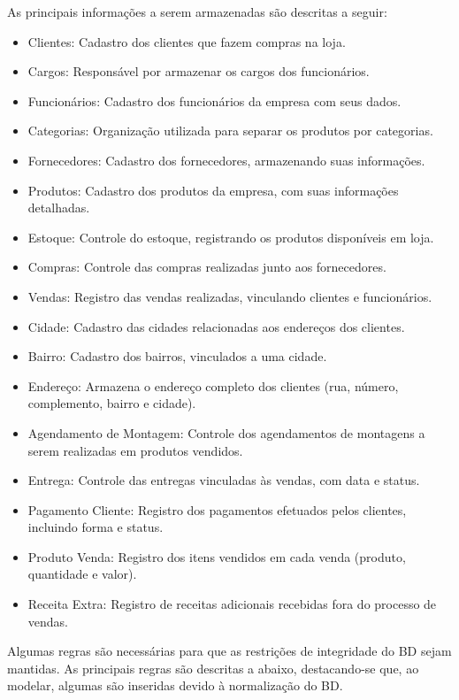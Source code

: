 \documentclass[
12pt,
a4paper,
semrecuonosumario,
sumario = abnt-6027-2012]{report}
\begin{document}
	As principais informações a serem armazenadas são descritas a seguir:
	\begin{itemize}
	\item Clientes: Cadastro dos clientes que fazem compras na loja.
	
	\item Cargos: Responsável por armazenar os cargos dos funcionários.
	
	\item Funcionários: Cadastro dos funcionários da empresa com seus dados.
	
	\item Categorias: Organização utilizada para separar os produtos por categorias.
	
	\item Fornecedores: Cadastro dos fornecedores, armazenando suas informações.
	
	\item Produtos: Cadastro dos produtos da empresa, com suas informações detalhadas.
	
	\item Estoque: Controle do estoque, registrando os produtos disponíveis em loja.
	
	\item Compras: Controle das compras realizadas junto aos fornecedores.
	
	\item Vendas: Registro das vendas realizadas, vinculando clientes e funcionários.
	
	\item Cidade: Cadastro das cidades relacionadas aos endereços dos clientes.
	
	\item Bairro: Cadastro dos bairros, vinculados a uma cidade.
	
	\item Endereço: Armazena o endereço completo dos clientes (rua, número, complemento, bairro e cidade).
	
	\item Agendamento de Montagem: Controle dos agendamentos de montagens a serem realizadas em produtos vendidos.
	
	\item Entrega: Controle das entregas vinculadas às vendas, com data e status.
	
	\item Pagamento Cliente: Registro dos pagamentos efetuados pelos clientes, incluindo forma e status.
	
	\item Produto Venda: Registro dos itens vendidos em cada venda (produto, quantidade e valor).
	
	\item Receita Extra: Registro de receitas adicionais recebidas fora do processo de vendas.
\end{itemize}
	Algumas regras são necessárias para que as restrições de integridade do BD sejam mantidas. As principais regras são descritas a abaixo, destacando-se que, ao modelar, algumas são inseridas devido à normalização do BD.
	
\end{document}

